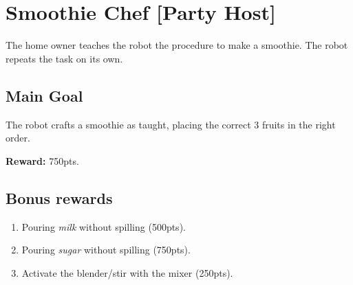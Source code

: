 \section{Smoothie Chef [Party Host]}
The home owner teaches the robot the procedure to make a smoothie.
The robot repeats the task on its own.



\subsection*{Main Goal}
The robot crafts a smoothie as taught, placing the correct 3 fruits in the right order.

\noindent\textbf{Reward:} 750pts.


\subsection*{Bonus rewards}
\begin{enumerate}[nosep]
	\item Pouring \emph{milk} without spilling (500pts).
	\item Pouring \emph{sugar} without spilling (750pts).
	\item Activate the blender/stir with the mixer (250pts).
\end{enumerate}

